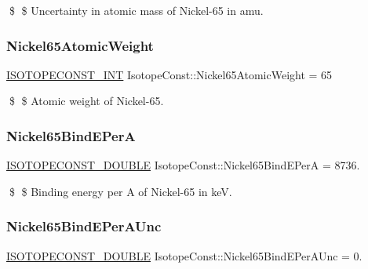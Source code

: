 \$ \$ Uncertainty in atomic mass of Nickel-\/65 in amu. \mbox{\label{group___isotope_const-_nickel-_ni65_ga21fcd37ca1e464f4ec65f6c97b46c91b}} 
\subsubsection{\texorpdfstring{Nickel65\+Atomic\+Weight}{Nickel65AtomicWeight}}
{\footnotesize\ttfamily \mbox{\hyperlink{group___isotope_const-_macros_ga5f18360b3e99483a35c32d789e62621c}{I\+S\+O\+T\+O\+P\+E\+C\+O\+N\+S\+T\+\_\+\+I\+NT}} Isotope\+Const\+::\+Nickel65\+Atomic\+Weight = 65}

\$ \$ Atomic weight of Nickel-\/65. \mbox{\label{group___isotope_const-_nickel-_ni65_ga23374d4b457246c561bf774474ce6b38}} 
\subsubsection{\texorpdfstring{Nickel65\+Bind\+E\+PerA}{Nickel65BindEPerA}}
{\footnotesize\ttfamily \mbox{\hyperlink{group___isotope_const-_macros_ga8f45a7272ce02c0b4c65c44636ed719a}{I\+S\+O\+T\+O\+P\+E\+C\+O\+N\+S\+T\+\_\+\+D\+O\+U\+B\+LE}} Isotope\+Const\+::\+Nickel65\+Bind\+E\+PerA = 8736.}

\$ \$ Binding energy per A of Nickel-\/65 in keV. \mbox{\label{group___isotope_const-_nickel-_ni65_ga0aac2b2d1bbbea5bb31a30bfca8a8f59}} 
\subsubsection{\texorpdfstring{Nickel65\+Bind\+E\+Per\+A\+Unc}{Nickel65BindEPerAUnc}}
{\footnotesize\ttfamily \mbox{\hyperlink{group___isotope_const-_macros_ga8f45a7272ce02c0b4c65c44636ed719a}{I\+S\+O\+T\+O\+P\+E\+C\+O\+N\+S\+T\+\_\+\+D\+O\+U\+B\+LE}} Isotope\+Const\+::\+Nickel65\+Bind\+E\+Per\+A\+Unc = 0.}

